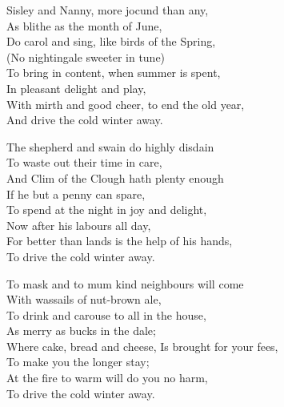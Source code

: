 \begin{dcverse}
\begin{altverse}
Sisley and Nanny, more jocund than any,\\
As blithe as the month of June,\\
Do carol and sing, like birds of the Spring,\\
(No nightingale sweeter in tune)\\
To bring in content, when summer is spent,\\
In pleasant delight and play,\\
With mirth and good cheer, to end the old year,\\
And drive the cold winter away.
\end{altverse}

\begin{altverse}
The shepherd and swain do highly disdain\\
To waste out their time in care,\\
And Clim of the Clough
hath plenty enough\\
If he but a penny can spare,\\
To spend at the night in joy and delight,\\
Now after his labours all day,\\
For better than lands is the help of his hands,\\
To drive the cold winter away.
\end{altverse}

\begin{altverse}
To mask and to mum kind neighbours will come\\
With wassails of nut-brown ale,\\
To drink and carouse to all in the house,\\
As merry as bucks in the dale;\\
Where cake, bread and cheese, Is brought for your fees,\\
To make you the longer stay;\\
At the fire to warm will do you no harm,\\
To drive the cold winter away.
\end{altverse}


\end{dcverse}
